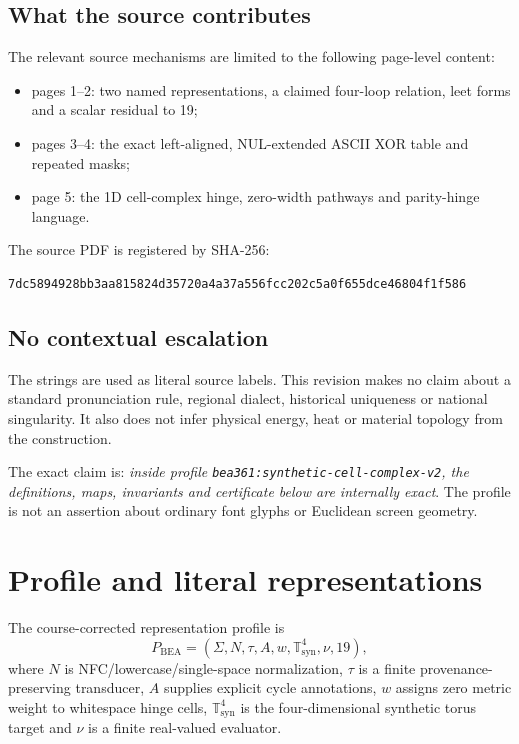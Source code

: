 \documentclass[10pt,a4paper]{article}
\newcommand{\code}[1]{\texttt{#1}}
\newcommand{\Tfour}{\mathbb T^4_{\mathrm{syn}}}
\begin{document}
\subsection{What the source contributes}
The relevant source mechanisms are limited to the following page-level content:
\begin{itemize}
\item pages 1--2: two named representations, a claimed four-loop relation, leet forms and a scalar residual to 19;
\item pages 3--4: the exact left-aligned, NUL-extended ASCII XOR table and repeated masks;
\item page 5: the 1D cell-complex hinge, zero-width pathways and parity-hinge language.
\end{itemize}
The source PDF is registered by SHA-256:
\begin{Verbatim}[breaklines=true,fontsize=\small]
7dc5894928bb3aa815824d35720a4a37a556fcc202c5a0f655dce46804f1f586
\end{Verbatim}

\subsection{No contextual escalation}
The strings are used as literal source labels. This revision makes no claim about a standard pronunciation rule, regional dialect, historical uniqueness or national singularity. It also does not infer physical energy, heat or material topology from the construction.

\begin{boundbox}
The exact claim is: \emph{inside profile \code{bea361:synthetic-cell-complex-v2}, the definitions, maps, invariants and certificate below are internally exact}. The profile is not an assertion about ordinary font glyphs or Euclidean screen geometry.
\end{boundbox}

\section{Profile and literal representations}

\begin{definitionbox}
The course-corrected representation profile is
\[
P_{\mathrm{BEA}}=(\Sigma,N,\tau,A,w,\Tfour,\nu,19),
\]
where $N$ is NFC/lowercase/single-space normalization, $\tau$ is a finite provenance-preserving transducer, $A$ supplies explicit cycle annotations, $w$ assigns zero metric weight to whitespace hinge cells, $\Tfour$ is the four-dimensional synthetic torus target and $\nu$ is a finite real-valued evaluator.
\end{definitionbox}
\end{document}
